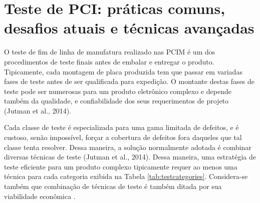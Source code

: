 \chapter{Teste de PCI: práticas comuns, desafios atuais e técnicas avançadas}

O teste de fim de linha de manufatura realizado nas PCIM é um dos procedimentos de teste finais antes de embalar e entregar o produto. Tipicamente, cada montagem de placa produzida tem que passar em variadas fases de teste antes de ser qualificada para expedição. O montante destas fases de teste pode ser numerosas para um produto eletrônico complexo e depende também da qualidade, e confiabilidade dos seus requerimentos de projeto (Jutman et al., 2014). 

Cada classe de teste é especializada para uma gama limitada de defeitos, e é custoso, senão impossível, forçar a cobertura de defeitos fora daqueles que tal classe tenta resolver. Dessa maneira, a solução normalmente adotada é combinar diversas técnicas de teste (Jutman et al., 2014). Dessa maneira, uma estratégia de teste eficiente para um produto complexo tipicamente requer ao menos uma técnica para cada categoria exibida na Tabela \ref{tab:testcategories}. Considera-se também que combinação de técnicas de teste é também ditada por sua viabilidade econômica \citep{davis1994economics}.

\newpage

